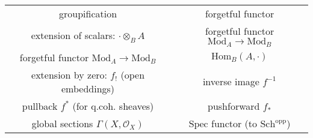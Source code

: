 \documentclass[10pt]{article}
\newcommand{\scr}[1]{\mathcal{#1}}
\newcommand{\Hom}{\mathrm{Hom}}
\newcommand{\spec}{\mathrm{Spec}}
\begin{document}
\begin{center}
\begin{tabular}{|c| c|}
groupification & forgetful functor \\
extension of scalars: $\cdot \otimes_{B} A$ & forgetful functor $\mathrm{Mod}_{A} \to \mathrm{Mod}_{B}$ \\
forgetful functor $\mathrm{Mod}_{A} \to \mathrm{Mod}_{B}$ &  $\Hom_{B}(A, \cdot)$ \\
extension by zero: $f_{!}$ (open embeddings)  & inverse image $f^{-1}$ \\
pullback $f^{*}$ (for q.coh. sheaves) & pushforward $f_{*}$ \\
global sections $\Gamma(X, \scr{O}_X)$ & $\spec$ functor (to $\mathrm{Sch}^{\text{opp}}$) \\
\hline
\end{tabular}
\end{center}
\end{document}
